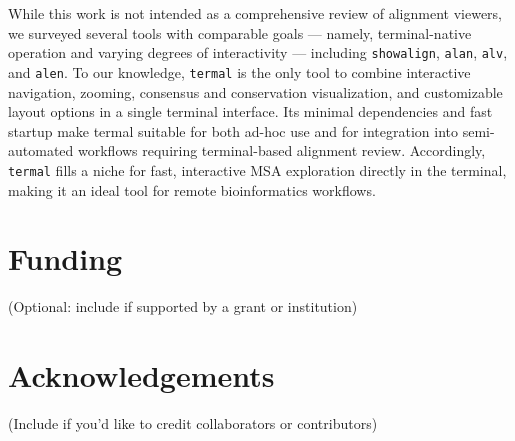 \documentclass[11pt]{article}
\begin{document}
While this work is not intended as a comprehensive review of alignment viewers,
we surveyed several tools with comparable goals — namely, terminal-native
operation and varying degrees of interactivity — including \texttt{showalign},
\texttt{alan}, \texttt{alv}, and \texttt{alen}.  To our knowledge,
\texttt{termal} is the only tool to combine interactive navigation, zooming,
consensus and conservation visualization, and customizable layout options in a
single terminal interface.  Its minimal dependencies and fast startup make
termal suitable for both ad-hoc use and for integration into semi-automated
workflows requiring terminal-based alignment review. Accordingly,
\texttt{termal} fills a niche for fast, interactive MSA exploration directly in
the terminal, making it an ideal tool for remote bioinformatics workflows.

\section*{Funding}

(Optional: include if supported by a grant or institution)

\section*{Acknowledgements}

(Include if you'd like to credit collaborators or contributors)


\end{document}
